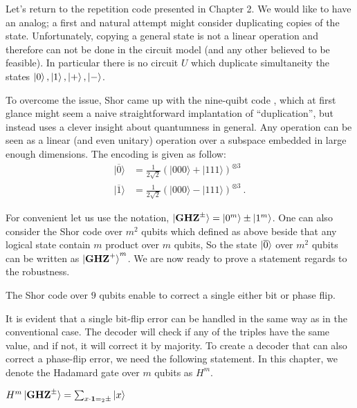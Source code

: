 Let's return to the repetition code presented in Chapter 2. We would like to have an analog; a first and natural attempt might consider duplicating copies of the state. Unfortunately, copying a general state is not a linear operation and therefore can not be done in the circuit model (and any other believed to be feasible). In particular there is no circuit $U$ which duplicate simultaneity the states $\ket{0}, \ket{1}, \ket{+}, \ket{-}$.

To overcome the issue, Shor came up with the nine-quibt code \cite{Ninequ}, which at first glance might seem a naive straightforward implantation of ``duplication'', but instead uses a clever insight about quantumness in general. Any operation can be seen as a linear (and even unitary) operation over a subspace embedded in large enough dimensions. The encoding is given as follow: 
\begin{equation*}
  \begin{split}
    |\overline{0}\rangle&=\frac{1}{2\sqrt{2}}\left(|000\rangle+|111\rangle\right)^{\otimes3}\\
    |\overline{1}\rangle&=\frac{1}{2\sqrt{2}}\left(|000\rangle-|111\rangle\right)^{\otimes3}~.
  \end{split}
\end{equation*}


For convenient let us use the notation, $\ket{\mathbf{GHZ}^{\pm}} =  \ket{0^{m}} \pm  \ket{1^{m}}$. One can also consider the Shor code over $m^{2}$ qubits which defined as above beside that any logical state contain $m$ product over $m$ qubits, So the state $\ket{\overline{0}}$ over $m^{2}$ qubits can be written as $\ket{\mathbf{GHZ}^{+}}^{m}$. We are now ready to prove a statement regards to the robustness.  

\begin{lemma}
  The Shor code over $9$ qubits enable to correct a single either bit or phase flip.  
\end{lemma}
It is evident that a single bit-flip error can be handled in the same way as in the conventional case. The decoder will check if any of the triples have the same value, and if not, it will correct it by majority. To create a decoder that can also correct a phase-flip error, we need the following statement. In this chapter, we denote the Hadamard gate over $m$ qubits as $H^m$.
\begin{claim}
   $H^{m}\ket{\mathbf{GHZ}^{\pm}} = \sum_{ x \cdot \mathbf{1} =_2 \pm }{\ket{x} }$
\end{claim}

